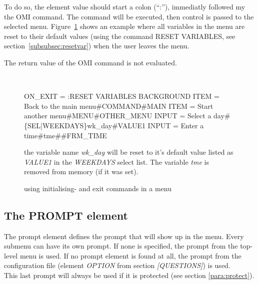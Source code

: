\documentclass[a4paper]{book}
\renewcommand{\indent}{\hspace*{5mm}}
\begin{document}
To do so, the element value should start a colon (``:''), immediatly followed my the OMI command.
The command will be executed, then control is passed to the selected menu. Figure~\ref{fig:iecmds}
shows an example where all variables in the menu are reset to their default values (using the
command \textsf{RESET VARIABLES}, see section~\ref{subsubsec:resetvar}) when the user leaves the
menu.

The return value of the OMI command is not evaluated.

\begin{figure}[h!tb]
\begin{minipage}[h!tb]{\textwidth}
\hrulefill \\
\begin{ttfamily}\begin{small}
 \newline
\indent ON{\_}EXIT = :RESET VARIABLES BACKGROUND \newline
\indent ITEM  = Back to the main menu{\#}COMMAND{\#}MAIN \newline
\indent ITEM  = Start another menu{\#}MENU{\#}OTHER{\_}MENU \newline
\indent INPUT = Select a day\#\{SEL|WEEKDAYS\}wk\_day\#VALUE1 \newline
\indent INPUT = Enter a time\#tme\#\#FRM\_TIME
\end{small}\end{ttfamily}
\noindent  the variable name \textit{wk\_day} will be reset to it's default value listed as \textit{VALUE1}
in the \textit{WEEKDAYS} select list. The variable \textit{tme} is removed from memory (if it was
set).
\caption{using initialising- and exit commands in a menu}\label{fig:iecmds}
\hrulefill
\end{minipage}
\end{figure}

\subsection{The PROMPT element}
\label{subsubsec:mylabel23}

The prompt element defines the prompt that 
will show up in the menu. Every submenu can have its own prompt. If none is 
specified, the prompt from the top-level menu is used. If no prompt element 
is found at all, the prompt from the configuration file (element \textsl{OPTION} from 
section \textsl{[QUESTIONS]}) is used. \\
This last prompt will always be used if it is protected (see section \ref{para:protect}).
\end{document}
